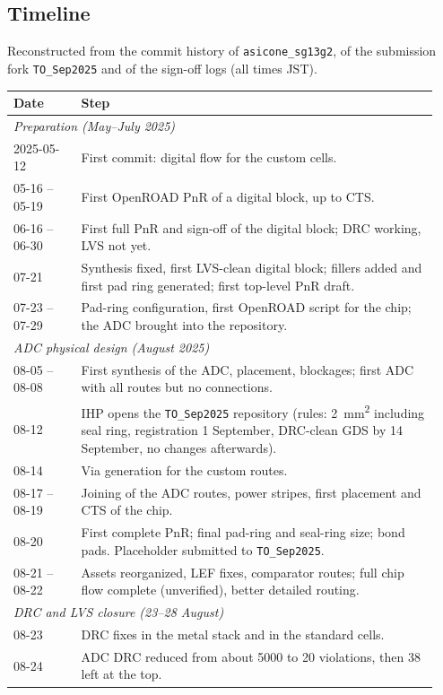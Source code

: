 \documentclass[10pt,a4paper]{article}
\begin{document}
\subsection{Timeline}
Reconstructed from the commit history of \texttt{asicone\_sg13g2}, of the submission fork
\texttt{TO\_Sep2025} and of the sign-off logs (all times JST).
\begin{longtable}{p{0.15\linewidth}p{0.79\linewidth}}
\toprule
Date & Step \\
\midrule
\endhead
\multicolumn{2}{l}{\textit{Preparation (May--July 2025)}} \\
2025-05-12 & First commit: digital flow for the custom cells. \\
05-16 -- 05-19 & First OpenROAD PnR of a digital block, up to CTS. \\
06-16 -- 06-30 & First full PnR and sign-off of the digital block; DRC working, LVS not yet. \\
07-21 & Synthesis fixed, first LVS-clean digital block; fillers added and first pad ring generated;
  first top-level PnR draft. \\
07-23 -- 07-29 & Pad-ring configuration, first OpenROAD script for the chip; the ADC brought into the repository. \\
\multicolumn{2}{l}{\textit{ADC physical design (August 2025)}} \\
08-05 -- 08-08 & First synthesis of the ADC, placement, blockages; first ADC with all routes but no connections. \\
08-12 & IHP opens the \texttt{TO\_Sep2025} repository (rules: \SI{2}{mm^2} including seal ring, registration
  1 September, DRC-clean GDS by 14 September, no changes afterwards). \\
08-14 & Via generation for the custom routes. \\
08-17 -- 08-19 & Joining of the ADC routes, power stripes, first placement and CTS of the chip. \\
08-20 & First complete PnR; final pad-ring and seal-ring size; bond pads. Placeholder submitted to \texttt{TO\_Sep2025}. \\
08-21 -- 08-22 & Assets reorganized, LEF fixes, comparator routes; full chip flow complete (unverified), better detailed routing. \\
\multicolumn{2}{l}{\textit{DRC and LVS closure (23--28 August)}} \\
08-23 & DRC fixes in the metal stack and in the standard cells. \\
08-24 & ADC DRC reduced from about 5000 to 20 violations, then 38 left at the top. \\

\end{longtable}
\end{document}
